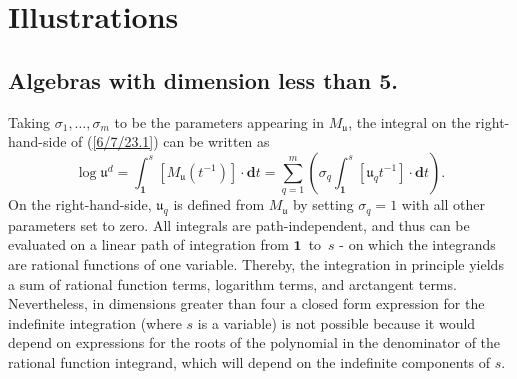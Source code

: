 \documentclass{amsart}
\theoremstyle{definition}
\numberwithin{theorem}{section}
\numberwithin{equation}{section}
\begin{document}
     \section{Illustrations} \subsection{Algebras with dimension less than 5.}
     
Taking $\sigma_1,\dots,\sigma_m$ to be the parameters appearing in $M_{\mathfrak{u}}$, the integral on the right-hand-side of (\ref{6/7/23.1}) can be written as 
\begin{equation}\label{9/26/23.1} \log  \mathfrak{u}^d = \int_{\mathbf{1}}^s [M_{\mathfrak{u}} (t^{-1})]\cdot \mathbf{d}t =\sum_{q=1}^m \left(\sigma_q \int_{\mathbf{1}}^s [\mathfrak{u}_q t^{-1}]\cdot \mathbf{d}t\right).\end{equation}
On the right-hand-side, $\mathfrak{u}_q$ is defined from $M_\mathfrak{u}$ by setting $\sigma_q =1$ with all other parameters set to zero.   All integrals are path-independent, and thus can be evaluated on a linear path of integration from \mbox{$\mathbf{1}$ to $s$} - on which the integrands are rational functions of one variable.  Thereby, the integration in principle yields a sum of rational function terms, logarithm terms, and arctangent terms.  Nevertheless, in dimensions greater than four a closed form expression for the indefinite integration (where $s$ is a variable) is not possible because it would depend on expressions for the roots of the polynomial in the denominator of the rational function integrand, which will depend on the indefinite components of $s$.  
\end{document}

